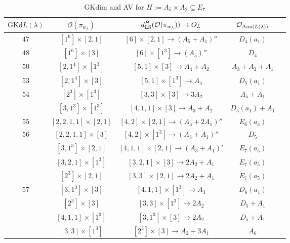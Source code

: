 \documentclass[reqno,12pt]{amsart}
\numberwithin{equation}{section}
\theoremstyle{plain}
\theoremstyle{definition}
\newcommand{\lam}{\lambda}
\renewcommand{\subset}{\subseteq}
\begin{document}
\begin{table}[htbp]\caption{ GKdim and AV for $H:=A_5\times A_2\subset E_7$}
	\label{taba5a2}
	\centering
	\renewcommand{\arraystretch}{1.5}
	\setlength\tabcolsep{5pt}
	
	\begin{tabular}{|c|c|c|c|c|}
		\hline $\mathrm{GKd} L(\lambda)$ &   $\mathcal{O}({\pi_{w_{\lam}}})$& $d_{\rm LS}^{H}(\mathcal{O}(\pi_{w_\lambda}))\rightarrow O_{L}$ & $\mathcal{O}_{{\rm Ann}(L(\lambda))}$ \\ \hline

$47$ 
&  $ [1^6]\times [2,1]$  &$[6]\times [2,1]\rightarrow (A_5+A_1)''$ &   $D_4(a_1)$ \\
\hline

$48$ 
&  $ [1^6]\times [3]$  &{$[6]\times [1^3]\rightarrow (A_5)''$  }&   $D_4$ \\
\hline


$50$ 
&  $ [2,1^4]\times [1^3]$  &$[5,1]\times [3]\rightarrow A_4+A_2$  &   $A_3+A_2+A_1$ \\
\hline




$53$ 
&  $ [2,1^4]\times [3]$  &$[5,1]\times [1^3]\rightarrow A_4$  &   $D_5(a_1)$ \\
\hline

$54$ 
&  $ [2^3]\times [1^3]$  &$[3,3]\times [3]\rightarrow 3A_2$  &   $A_5+A_1$ \\
&  $ [3,1^3]\times [1^3]$  &$[4,1,1]\times [3]\rightarrow A_3+A_2$  &   $D_5(a_1)+A_1$ \\
\hline

$55$ 
&  $ [2,2,1,1]\times [2,1]$  &$[4,2]\times [2,1]\rightarrow (A_3+2A_1)''$  &   $E_6(a_3)$ \\
\hline

$56$ 
&  $ [2,2,1,1]\times [3]$  &  $[4,2]\times [1^3]\rightarrow (A_3+A_1)''$ &   $D_5$ \\

& $ [3,1^3]\times [2,1]$  &$[4,1,1]\times [2,1]\rightarrow (A_3+A_1)'$ &   $E_7(a_5)$ \\

& $ [3,2,1]\times [1^3]$  &$[3,2,1]\times [3]\rightarrow 2A_2+A_1$  &   $E_7(a_5)$ \\
& $ [2^3]\times [2,1]$  &$[3,3]\times [2,1]\rightarrow 2A_2+A_1$  &   $E_7(a_5)$ \\\hline

$57$ 
& $ [3,1^3]\times [3]$  &$[4,1,1]\times [1^3]\rightarrow A_3$  &   $D_6(a_1)$ \\
& $ [2^3]\times [3]$  &$[3,3]\times [1^3]\rightarrow 2A_2$  &   $D_5+A_1$ \\
& $ [4,1,1]\times [1^3]$  &$[3,1^3]\times [3]\rightarrow 2A_2$  &   $D_5+A_1$ \\
& $ [3,3]\times [1^3]$  &$[2^3]\times [3]\rightarrow A_2+3A_1$  &   $A_6$ \\
\hline


\end{tabular}
\end{table}
\end{document}
